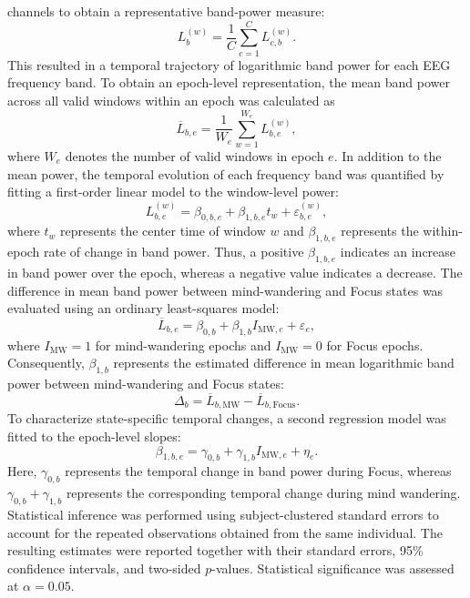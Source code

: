 \documentclass[conference]{IEEEtran}
\begin{document}
channels to obtain a representative band-power measure: \begin{equation} L_b^{(w)} = \frac{1}{C} \sum_{c=1}^{C} L_{c,b}^{(w)}. \end{equation} This resulted in a temporal trajectory of logarithmic band power for each EEG frequency band. To obtain an epoch-level representation, the mean band power across all valid windows within an epoch was calculated as \begin{equation} \overline{L}_{b,e} = \frac{1}{W_e} \sum_{w=1}^{W_e} L_{b,e}^{(w)}, \end{equation} where $W_e$ denotes the number of valid windows in epoch $e$. In addition to the mean power, the temporal evolution of each frequency band was quantified by fitting a first-order linear model to the window-level power: \begin{equation} L_{b,e}^{(w)} = \beta_{0,b,e} + \beta_{1,b,e}t_w + \varepsilon_{b,e}^{(w)}, \end{equation} where $t_w$ represents the center time of window $w$ and $\beta_{1,b,e}$ represents the within-epoch rate of change in band power. Thus, a positive $\beta_{1,b,e}$ indicates an increase in band power over the epoch, whereas a negative value indicates a decrease. The difference in mean band power between mind-wandering and Focus states was evaluated using an ordinary least-squares model: \begin{equation} \overline{L}_{b,e} = \beta_{0,b} + \beta_{1,b}I_{\mathrm{MW},e} + \varepsilon_e, \end{equation} where $I_{\mathrm{MW}}=1$ for mind-wandering epochs and $I_{\mathrm{MW}}=0$ for Focus epochs. Consequently, $\beta_{1,b}$ represents the estimated difference in mean logarithmic band power between mind-wandering and Focus states: \begin{equation} \Delta_b = \overline{L}_{b,\mathrm{MW}} - \overline{L}_{b,\mathrm{Focus}}. \end{equation} To characterize state-specific temporal changes, a second regression model was fitted to the epoch-level slopes: \begin{equation} \beta_{1,b,e} = \gamma_{0,b} + \gamma_{1,b}I_{\mathrm{MW},e} + \eta_e. \end{equation} Here, $\gamma_{0,b}$ represents the temporal change in band power during Focus, whereas $\gamma_{0,b}+\gamma_{1,b}$ represents the corresponding temporal change during mind wandering. Statistical inference was performed using subject-clustered standard errors to account for the repeated observations obtained from the same individual. The resulting estimates were reported together with their standard errors, 95\% confidence intervals, and two-sided $p$-values. Statistical significance was assessed at $\alpha=0.05$.
\end{document}
